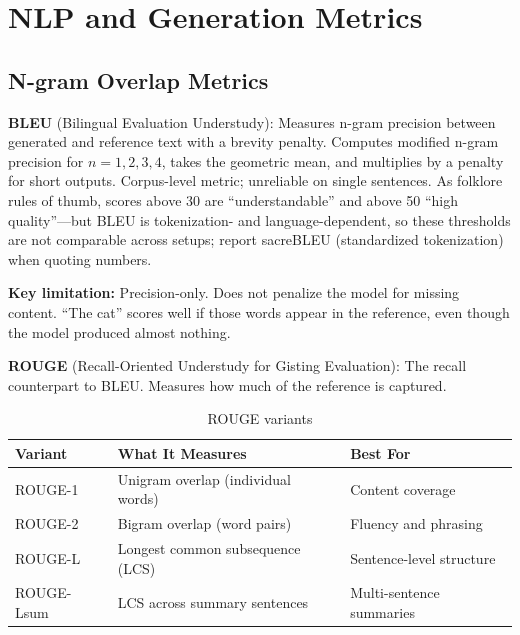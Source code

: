 \section{NLP and Generation Metrics}
\label{sec:nlp_metrics}

\subsection{N-gram Overlap Metrics}

\textbf{BLEU} (Bilingual Evaluation Understudy): Measures n-gram precision between generated and reference text with a brevity penalty. Computes modified n-gram precision for $n = 1, 2, 3, 4$, takes the geometric mean, and multiplies by a penalty for short outputs. Corpus-level metric; unreliable on single sentences. As folklore rules of thumb, scores above 30 are ``understandable'' and above 50 ``high quality''---but BLEU is tokenization- and language-dependent, so these thresholds are not comparable across setups; report sacreBLEU (standardized tokenization) when quoting numbers.

\textbf{Key limitation:} Precision-only. Does not penalize the model for missing content. ``The cat'' scores well if those words appear in the reference, even though the model produced almost nothing.

\textbf{ROUGE} (Recall-Oriented Understudy for Gisting Evaluation): The recall counterpart to BLEU. Measures how much of the reference is captured.

\begin{table}[H]
\centering
\caption{ROUGE variants}
\begin{tabularx}{\textwidth}{lXX}
\toprule
\textbf{Variant} & \textbf{What It Measures} & \textbf{Best For} \\
\midrule
ROUGE-1 & Unigram overlap (individual words) & Content coverage \\
ROUGE-2 & Bigram overlap (word pairs) & Fluency and phrasing \\
ROUGE-L & Longest common subsequence (LCS) & Sentence-level structure \\
ROUGE-Lsum & LCS across summary sentences & Multi-sentence summaries \\
\bottomrule
\end{tabularx}
\end{table}

